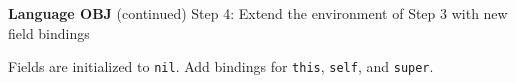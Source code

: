 \begin{minipage}[t]{\sw}
\slidenumber
\LARGE
{\bf Language OBJ} (continued)\exx
Step 4: Extend the environment of Step 3 with new field bindings\exx
\centerline{}
Fields are initialized to \verb'nil'.
Add bindings for \verb'this', \verb'self', and \verb'super'.

\end{minipage}
